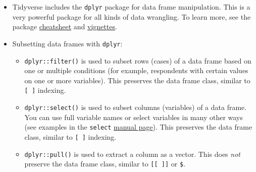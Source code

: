 \documentclass[
]{book}
\newenvironment{Shaded}{\begin{snugshade}}{\end{snugshade}}
\newcommand{\CommentTok}[1]{\textcolor[rgb]{0.56,0.35,0.01}{\textit{#1}}}
\newcommand{\NormalTok}[1]{#1}
\newcommand{\OtherTok}[1]{\textcolor[rgb]{0.56,0.35,0.01}{#1}}
\newcommand{\SpecialCharTok}[1]{\textcolor[rgb]{0.81,0.36,0.00}{\textbf{#1}}}
\providecommand{\tightlist}{%
  \setlength{\itemsep}{0pt}\setlength{\parskip}{0pt}}
\begin{document}
\begin{itemize}
\tightlist
\item
  Tidyverse includes the \texttt{dplyr} package for data frame manipulation. This is a very powerful package for all kinds of data wrangling. To learn more, see the package \href{https://www.rstudio.com/wp-content/uploads/2015/02/data-wrangling-cheatsheet.pdf}{cheatsheet} and \href{https://dplyr.tidyverse.org/articles/index.html}{vignettes}.
\item
  Subsetting data frames with \texttt{dplyr}:

  \begin{itemize}
  \tightlist
  \item
    \texttt{dplyr::filter()} is used to subset rows (cases) of a data frame based on one or multiple conditions (for example, respondents with certain values on one or more variables). This preserves the data frame class, similar to \texttt{{[}\ {]}} indexing.
  \item
    \texttt{dplyr::select()} is used to subset columns (variables) of a data frame. You can use full variable names or select variables in many other ways (see examples in the \texttt{select} \href{https://dplyr.tidyverse.org/reference/select.html}{manual page}). This preserves the data frame class, similar to \texttt{{[}\ {]}} indexing.
  \item
    \texttt{dplyr::pull()} is used to extract a column as a vector. This does \emph{not} preserve the data frame class, similar to \texttt{{[}{[}\ {]}{]}} or \texttt{\$}.
  \end{itemize}
\end{itemize}

\begin{Shaded}
\end{Shaded}
\end{document}
